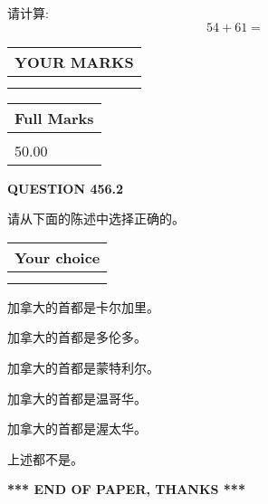 \documentclass{ctexart}
\begin{document}
  
 
请计算:
\begin{equation}
54 +  %
61 = \nonumber
\end{equation}
 

 

 
  
\vspace{0.2in}
  
\noindent\begin{tabular}{|l|}
\hline
 YOUR MARKS  \\
\hline
 \\ 
 \\ 
\hline
\end{tabular}
\hspace{0.05in} \begin{tabular}{|l|}
\hline
 Full Marks  \\
\hline
 \\ 
50.00 \\
\hline
\end{tabular}
{\textbf{\Large{QUESTION
456.2 
}}}
  
  
请从下面的陈述中选择正确的。
  
  
\noindent\hspace{3.0in} \begin{tabular}{|l|}
\hline
Your choice \\
\hline
 \\ 
 \\ 
\hline
\end{tabular}
  
  
 
 
加拿大的首都是卡尔加里。
 
 
加拿大的首都是多伦多。
 
 
加拿大的首都是蒙特利尔。
 
 
加拿大的首都是温哥华。
 
 
加拿大的首都是渥太华。
 
 
 上述都不是。
 
 
   
   
 \vspace{0.2in}
 
   
   
   
   
\vspace{1.0in} 
{\textbf{\large{ *** END OF PAPER, THANKS *** }}} 
   
\end{document}
